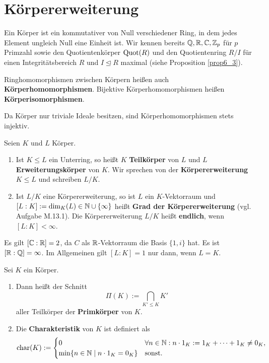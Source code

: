 \section{Körpererweiterung}
Ein Körper ist ein kommutativer von Null verschiedener Ring, in dem jedes Element ungleich Null eine Einheit ist. Wir kennen bereits $\mathbb{Q}, \mathbb{R}, \mathbb{C}, \mathbb{Z}_p$ für $p$ Primzahl sowie den Quotientenkörper $\mathrm{Quot}(R)$ und den Quotientenring $R/I$ für einen Integritätsbereich $R$ und $I \unlhd R$ maximal (siehe Proposition \ref{prop6_3}).

Ringhomomorphismen zwischen Körpern heißen auch \textbf{Körperhomomorphismen}. Bijektive Körperhomomorphismen heißen \textbf{Körperisomorphismen}.

Da Körper nur triviale Ideale besitzen, sind Körperhomomorphismen stets injektiv.
\begin{definition}
	Seien $K$ und $L$ Körper. 
	\begin{enumerate}[label=(\alph*)]
		\item Ist $K \leq L$ ein Unterring, so heißt $K$ \textbf{Teilkörper} von $L$ und $L$ \textbf{Erweiterungskörper} von $K$. Wir sprechen von der \textbf{Körpererweiterung} $K \leq L$ und schreiben $L / K$.
		\item Ist $L/K$ eine Körpererweiterung, so ist $L$ ein $K$-Vektorraum und $[L:K] := \dim_K(L) \in \mathbb{N} \cup \{\infty\}$ heißt \textbf{Grad der Körpererweiterung} (vgl. Aufgabe M.13.1).  Die Körpererweiterung $L/K$ heißt \textbf{endlich}, wenn $[L:K] < \infty$.
	\end{enumerate}
\end{definition}
\begin{beispiel}\label{beispiel7_2}
	Es gilt $[\mathbb{C} : \mathbb{R}] = 2$, da $C$ als $\mathbb{R}$-Vektorraum die Basis $\{1,i\}$ hat. Es ist $[\mathbb{R} : \mathbb{Q}] = \infty$. Im Allgemeinen gilt $[L : K] = 1$ nur dann, wenn $L = K$. 
\end{beispiel}
\begin{definition}
	Sei $K$ ein Körper. 
	\begin{enumerate}[label=(\alph*)]
		\item Dann heißt der Schnitt
		\[\Pi(K) := \bigcap_{K' \leq K} K'\]
		aller Teilkörper der \textbf{Primkörper} von $K$.
		\item Die \textbf{Charakteristik} von $K$ ist definiert als
		\[\mathrm{char}(K) := \begin{cases}
			0 & \forall n \in \mathbb{N} : n \cdot 1_K := 1_K + \dots + 1_K \neq 0_K,\\
			\min\{n \in \mathbb{N} \mid n \cdot 1_K = 0_K\} & \text{sonst.}
		\end{cases}\]
	\end{enumerate}
\end{definition}
